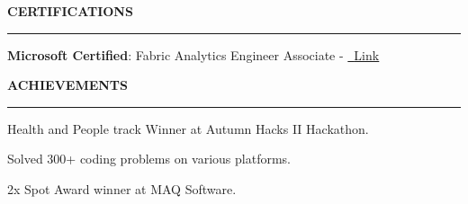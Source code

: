 \documentclass[11pt,letterpaper]{article}
\newenvironment{rSection}[1]{
  \medskip
  \MakeUppercase{\bf #1}
  \medskip
  \hrule
  \begin{list}{}{
    \setlength{\leftmargin}{1.5em}
  }
  \item[]
}{
  \end{list}
}
\begin{document}
\begin{rSection}{Certifications} 
\textbf{Microsoft Certified}: Fabric Analytics Engineer Associate - \href{https://learn.microsoft.com/api/credentials/share/en-us/MandapatiVarma/79FA7744283C6D62?sharingId=5C19EA4D7DF43118}{\raisebox{-0.2\height}\ \underline{Link}}

\end{rSection}
\begin{rSection}{Achievements} 
 Health and People track Winner at Autumn Hacks II Hackathon.
\item Solved 300+ coding problems on various platforms.
\item 2x Spot Award winner at MAQ Software.
\end{rSection}
\end{document}
